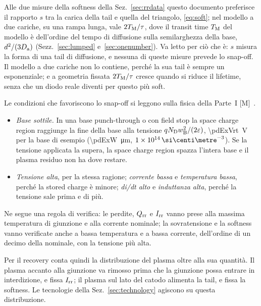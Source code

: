 \documentclass[10pt,a4paper]{scrartcl}
\let\newcommand\pdvaluedefine
\newcommand{\Irr}{I_\mathrm{rr}}
\newcommand{\Qrr}{Q_\mathrm{rr}}
\newcommand{\TM}{T_\mathrm{M}}
\newcommand{\ND}{N_\mathrm{D}}
\newcommand{\wB}{w_\mathrm{B}}
\newcommand{\Da}{D_\mathrm{a}}
\newcommand{\Pp}{p\textsuperscript{+}}
\newcommand{\Nm}{n\textsuperscript{--}}
\newcommand{\cmc}{\si{\centi\metre^{-3}}}
\begin{document}
Alle due misure della softness della Sez.~\ref{sec:rrdata} questo documento preferisce il rapporto $s$ tra la carica della tail e quella del triangolo, \eqref{eq:soft}; nel modello a due cariche, su una rampa lunga, vale $2\TM/\tau$, dove il transit time $\TM$ del modello è dell'ordine del tempo di diffusione sulla semilarghezza della base, $d^2/(3\Da)$ (Sezz.~\ref{sec:lumped} e~\ref{sec:onenumber}). Va letto per ciò che è: $s$ misura la forma di una tail di diffusione, e nessuna di queste misure prevede lo snap-off. Il modello a due cariche non lo contiene, perché la sua tail è sempre un esponenziale; e a geometria fissata $2\TM/\tau$ cresce quando si riduce il lifetime, senza che un diodo reale diventi per questo più soft.

Le condizioni che favoriscono lo snap-off si leggono sulla fisica della Parte~I [M]~\cite{lutz}.
\begin{itemize}
\item \emph{Base sottile.} In una base punch-through o con field stop la space charge region raggiunge la fine della base alla tensione $q\ND\wB^2/(2\varepsilon)$, \SI{\pdExVrt}{\volt} per la base di esempio (\SI{\pdExW}{\micro\metre}, $\pdExNd\,\cmc$). Se la tensione applicata la supera, la space charge region spazza l'intera base e il plasma residuo non ha dove restare.
\item \emph{Tensione alta}, per la stessa ragione; \emph{corrente bassa} e \emph{temperatura bassa}, perché la stored charge è minore; \emph{di/dt alto} e \emph{induttanza alta}, perché la tensione sale prima e di più.
\end{itemize}
Ne segue una regola di verifica: le perdite, $\Qrr$ e $\Irr$ vanno prese alla massima temperatura di giunzione e alla corrente nominale; la sovratensione e la softness vanno verificate anche a bassa temperatura e a bassa corrente, dell'ordine di un decimo della nominale, con la tensione più alta.

Per il recovery conta quindi la distribuzione del plasma oltre alla sua quantità. Il plasma accanto alla giunzione \Pp\Nm{} va rimosso prima che la giunzione possa entrare in interdizione, e fissa $\Irr$; il plasma sul lato del catodo alimenta la tail, e fissa la softness. Le tecnologie della Sez.~\ref{sec:technology} agiscono su questa distribuzione.
\end{document}
